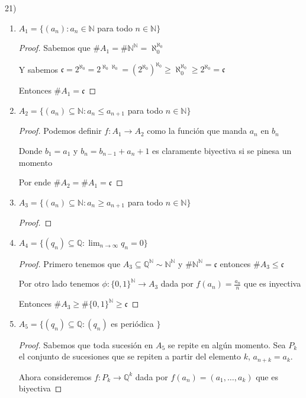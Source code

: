 \documentclass[12pt]{article}
\newcommand{\n}{\aleph_{0}}
\newcommand{\Q}{\mathbb{Q}}
\newcommand{\N}{\mathbb{N}}
\newcommand{\ra}{\rightarrow}
\theoremstyle{definition}
\begin{document}
21) 
\begin{enumerate}
  \item $A_{1} = \{(a_{n}) : a_{n} \in \N $ para todo $ n \in \N\}$
    \begin{proof}
      Sabemos que $\# A_{1} = \# \N^{\N} = \n^{\n} $

      Y sabemos $ \mathfrak{c} = 2^{\n}= 2^{\n \n}  = (2^{\n})^{\n} \geq \n^{\n} \geq 2^{\n} = \mathfrak{c}$ 

      Entonces $\# A_{1} = \mathfrak{c}$
    \end{proof}
  \item $A_{2} = \{(a_{n}) \subseteq \N : a_{n} \leq a_{n +1} $ para todo $ n \in \N \}$
    \begin{proof}
      Podemos definir $f:A_{1} \ra A_{2}$ como la función que manda $a_{n}$ en $b_{n}$ 
     
      Donde $b_{1} = a_{1}$ y $b_{n} = b_{n - 1} + a_{n} + 1$ es claramente biyectiva si se pinesa un momento

      Por ende $\# A_{2} = \# A_{1} = \mathfrak{c}$
    \end{proof}  
  \item $A_{3} = \{(a_{n}) \subseteq \N : a_{n} \geq a_{n +1} $ para todo $ n \in \N \}$
    \begin{proof}
      

    \end{proof} 
  \item $A_{4} = \{ (q_{n}) \subseteq \Q : \lim_{n \ra \infty} q_{n} = 0\}$
    \begin{proof}
Primero tenemos que $A_{3} \subseteq \Q^{\N} \sim \N^{\N}$ y $\# \N^{\N} = \mathfrak{c}$ entonces $\# A_{3} \leq \mathfrak{c}$

      Por otro lado tenemos $\phi : \{0,1\}^{\N} \ra A_{3} $ dada por $f(a_{n}) = \frac{a_{n}}{n}$ que es inyectiva

      Entonces $\# A_{3} \geq \# \{0,1\}^{\N} \geq \mathfrak{c}$

    \end{proof} 
  \item $A_{5} = \{ (q_{n}) \subseteq \Q : (q_{n}) $ es periódica $\}$
    \begin{proof}
      Sabemos que toda sucesión en $A_{5}$ se repite en algún momento. Sea $P_{k}$ el conjunto de sucesiones que se repiten a partir del elemento $k$, $a_{n + k} = a_{k}$. 

      Ahora consideremos $f: P_{k} \ra \Q^{k}$ dada por $f(a_{n}) = (a_{1}, \dots , a_{k})$ que es biyectiva


\end{proof}
\end{enumerate}
\end{document}
